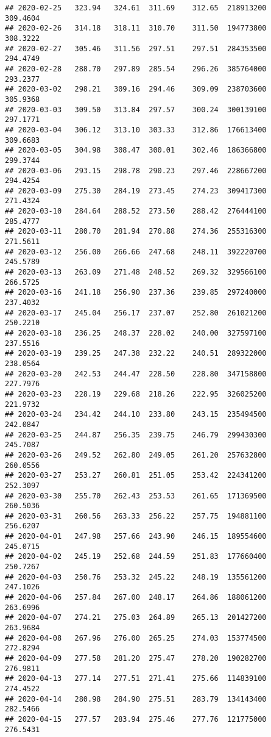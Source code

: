\documentclass[
]{article}
\begin{document}
\begin{verbatim}
## 2020-02-25   323.94   324.61  311.69    312.65  218913200     309.4604
## 2020-02-26   314.18   318.11  310.70    311.50  194773800     308.3222
## 2020-02-27   305.46   311.56  297.51    297.51  284353500     294.4749
## 2020-02-28   288.70   297.89  285.54    296.26  385764000     293.2377
## 2020-03-02   298.21   309.16  294.46    309.09  238703600     305.9368
## 2020-03-03   309.50   313.84  297.57    300.24  300139100     297.1771
## 2020-03-04   306.12   313.10  303.33    312.86  176613400     309.6683
## 2020-03-05   304.98   308.47  300.01    302.46  186366800     299.3744
## 2020-03-06   293.15   298.78  290.23    297.46  228667200     294.4254
## 2020-03-09   275.30   284.19  273.45    274.23  309417300     271.4324
## 2020-03-10   284.64   288.52  273.50    288.42  276444100     285.4777
## 2020-03-11   280.70   281.94  270.88    274.36  255316300     271.5611
## 2020-03-12   256.00   266.66  247.68    248.11  392220700     245.5789
## 2020-03-13   263.09   271.48  248.52    269.32  329566100     266.5725
## 2020-03-16   241.18   256.90  237.36    239.85  297240000     237.4032
## 2020-03-17   245.04   256.17  237.07    252.80  261021200     250.2210
## 2020-03-18   236.25   248.37  228.02    240.00  327597100     237.5516
## 2020-03-19   239.25   247.38  232.22    240.51  289322000     238.0564
## 2020-03-20   242.53   244.47  228.50    228.80  347158800     227.7976
## 2020-03-23   228.19   229.68  218.26    222.95  326025200     221.9732
## 2020-03-24   234.42   244.10  233.80    243.15  235494500     242.0847
## 2020-03-25   244.87   256.35  239.75    246.79  299430300     245.7087
## 2020-03-26   249.52   262.80  249.05    261.20  257632800     260.0556
## 2020-03-27   253.27   260.81  251.05    253.42  224341200     252.3097
## 2020-03-30   255.70   262.43  253.53    261.65  171369500     260.5036
## 2020-03-31   260.56   263.33  256.22    257.75  194881100     256.6207
## 2020-04-01   247.98   257.66  243.90    246.15  189554600     245.0715
## 2020-04-02   245.19   252.68  244.59    251.83  177660400     250.7267
## 2020-04-03   250.76   253.32  245.22    248.19  135561200     247.1026
## 2020-04-06   257.84   267.00  248.17    264.86  188061200     263.6996
## 2020-04-07   274.21   275.03  264.89    265.13  201427200     263.9684
## 2020-04-08   267.96   276.00  265.25    274.03  153774500     272.8294
## 2020-04-09   277.58   281.20  275.47    278.20  190282700     276.9811
## 2020-04-13   277.14   277.51  271.41    275.66  114839100     274.4522
## 2020-04-14   280.98   284.90  275.51    283.79  134143400     282.5466
## 2020-04-15   277.57   283.94  275.46    277.76  121775000     276.5431

\end{verbatim}
\end{document}
